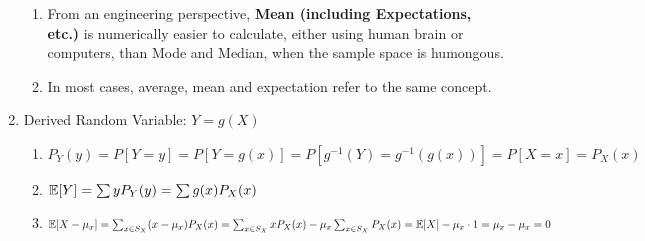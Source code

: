 \begin{enumerate}
{\begin{enumerate}
{\begin{enumerate}
                    \item Definition:{
                        \begin{align}
                            \mu_x = \E{X}&=\sum_{x\in S_X}xP_X(x) \tag{First Moment of $X$}\\
                            \E{X^2}&=\sum_{x\in S_X}x^2P_X(x) \tag{Second Moment of $X$}
                        \end{align}
                    }
                    \item Important Expectations{
                        \begin{enumerate}
                            \item Bernoulli(p): \[\E{X}=0\cdot P_X(0)+1\cdot P_X(1)=0(1-p)+1(p)=p\]
                            \item Binomial(n, p): \[\E{X}=np\]
                            \item Poisson($\alpha$): \[\E{X}=\alpha\]
                            \item Geometric(p): \[\E{X}=\sum_{x=1}^{\infty}xP_X(x)=\sum_{x=1}^{\infty}xp(1-p)^{x-1}=\dfrac{p}{1-p}\sum_{x=1}^{\infty}x(1-p)^x=\dfrac{p}{1-p}\dfrac{1-p}{[1-(1-p)]^2}=\dfrac{p}{p^2}=\dfrac{1}{p}\]
                            \item Pascal(k, p): \[\E{X}=k/p\]
                            \item Discrete Uniform(k, l): \[\E{X}=(k+l)/2\]
                        \end{enumerate}
                    }
                \end{enumerate}
            }
            \item From an engineering perspective, \textbf{Mean (including Expectations, etc.)} is numerically easier to calculate, either using human brain or computers, than Mode and Median, when the sample space is humongous. 
            \item In most cases, average, mean and expectation refer to the same concept. 
        \end{enumerate}
    }
    \item Derived Random Variable: $Y = g(X)${
        \begin{enumerate}
            \item $P_Y(y) = P[Y=y] = P[Y=g(x)] = P[g^{-1}(Y)=g^{-1}(g(x))] = P[X=x] = P_X(x)$
            \item $\E{Y} = \sum yP_Y(y) = \sum g(x)P_X(x)$
            \item $\E{X-\mu_x}=\sum_{x\in S_X}(x-\mu_x)P_X(x)=\sum_{x\in S_X}xP_X(x)-\mu_x\sum_{x\in S_X}P_X(x)=\E{X}-\mu_x\cdot 1=\mu_x-\mu_x=0$

\end{enumerate}}
\end{enumerate}
